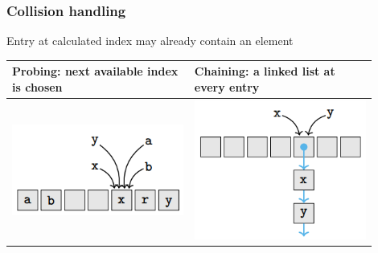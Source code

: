     \subsubsection{Collision handling}
        Entry at calculated index may already contain an element
        \begin{tabular}{p{0.45\linewidth} | p{0.45\linewidth}}
            \hline
            Probing: next available index is chosen & Chaining: a linked list at every entry\\
            \hline
            \includegraphics[width = \linewidth]{src/4_data_structure/images/probing.png} & \includegraphics[width = \linewidth]{src/4_data_structure/images/chaining.png}
        \end{tabular}
